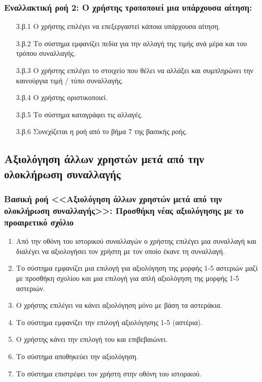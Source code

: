 \documentclass[12pt,a4paper]{article}
\begin{document}
\subsubsection*{Εναλλακτική ροή 2: Ο χρήστης τροποποιεί μια υπάρχουσα αίτηση:}
\begin{enumerate}
    \item[3.β.1] Ο χρήστης επιλέγει να επεξεργαστεί κάποια υπάρχουσα αίτηση. 
    \item[3.β.2] Το σύστημα εμφανίζει πεδία για την αλλαγή της τιμής ανά μέρα και του τρόπου συναλλαγής. 
    \item[3.β.3] Ο χρήστης επιλέγει το στοιχείο που θέλει να αλλάξει και συμπληρώνει την καινούργια τιμή / τύπο συναλλαγής.  
    \item[3.β.4] Ο χρήστης οριστικοποιεί.
    \item[3.β.5] Το σύστημα καταγράφει τις αλλαγές.
    \item[3.β.6] Συνεχίζεται η ροή από το βήμα 7 της βασικής ροής.
\end{enumerate}

\subsection{Αξιολόγηση άλλων χρηστών μετά από την ολοκλήρωση συναλλαγής}

\subsubsection*{Βασική ροή <<Αξιολόγηση άλλων χρηστών μετά από την ολοκλήρωση συναλλαγής>>: Προσθήκη νέας αξιολόγησης με το προαιρετικό σχόλιο}
\begin{enumerate}
    \item Από την οθόνη του ιστορικού συναλλαγών ο χρήστης επιλέγει μια συναλλαγή και διαλέγει να αξιολογήσει τον χρήστη με τον οποίο έκανε τη συναλλαγή. 
    \item Το σύστημα εμφανίζει μια επιλογή για αξιολόγηση της μορφής 1-5 αστεριών μαζί με προσθήκη σχολίου και μια επιλογή για απλή αξιολόγηση της μορφής 1-5 αστεριών. 
    \item Ο χρήστης επιλέγει να κάνει αξιολόγηση μόνο με βάση τα αστεράκια. 
    \item Το σύστημα εμφανίζει την επιλογή αξιολόγησης 1-5 (αστέρια). 
    \item Ο χρήστης κάνει την επιλογή του και επιβεβαιώνει.
    \item Το σύστημα αποθηκεύει την αξιολόγηση.
    \item Το σύστημα επιστρέφει τον χρήστη στην οθόνη του ιστορικού.
\end{enumerate}
\end{document}
